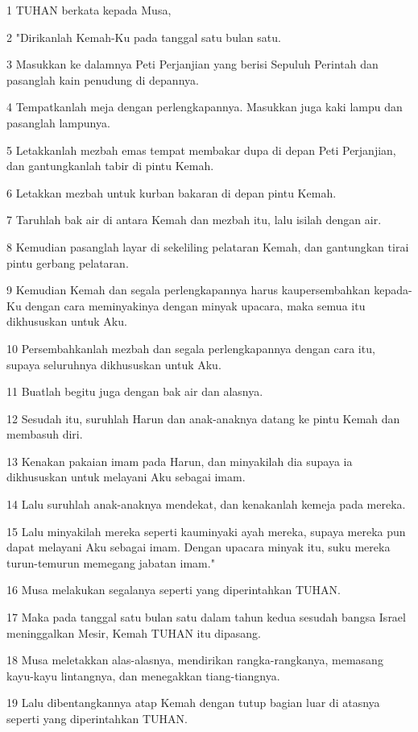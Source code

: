 \par 1 TUHAN berkata kepada Musa,
\par 2 "Dirikanlah Kemah-Ku pada tanggal satu bulan satu.
\par 3 Masukkan ke dalamnya Peti Perjanjian yang berisi Sepuluh Perintah dan pasanglah kain penudung di depannya.
\par 4 Tempatkanlah meja dengan perlengkapannya. Masukkan juga kaki lampu dan pasanglah lampunya.
\par 5 Letakkanlah mezbah emas tempat membakar dupa di depan Peti Perjanjian, dan gantungkanlah tabir di pintu Kemah.
\par 6 Letakkan mezbah untuk kurban bakaran di depan pintu Kemah.
\par 7 Taruhlah bak air di antara Kemah dan mezbah itu, lalu isilah dengan air.
\par 8 Kemudian pasanglah layar di sekeliling pelataran Kemah, dan gantungkan tirai pintu gerbang pelataran.
\par 9 Kemudian Kemah dan segala perlengkapannya harus kaupersembahkan kepada-Ku dengan cara meminyakinya dengan minyak upacara, maka semua itu dikhususkan untuk Aku.
\par 10 Persembahkanlah mezbah dan segala perlengkapannya dengan cara itu, supaya seluruhnya dikhususkan untuk Aku.
\par 11 Buatlah begitu juga dengan bak air dan alasnya.
\par 12 Sesudah itu, suruhlah Harun dan anak-anaknya datang ke pintu Kemah dan membasuh diri.
\par 13 Kenakan pakaian imam pada Harun, dan minyakilah dia supaya ia dikhususkan untuk melayani Aku sebagai imam.
\par 14 Lalu suruhlah anak-anaknya mendekat, dan kenakanlah kemeja pada mereka.
\par 15 Lalu minyakilah mereka seperti kauminyaki ayah mereka, supaya mereka pun dapat melayani Aku sebagai imam. Dengan upacara minyak itu, suku mereka turun-temurun memegang jabatan imam."
\par 16 Musa melakukan segalanya seperti yang diperintahkan TUHAN.
\par 17 Maka pada tanggal satu bulan satu dalam tahun kedua sesudah bangsa Israel meninggalkan Mesir, Kemah TUHAN itu dipasang.
\par 18 Musa meletakkan alas-alasnya, mendirikan rangka-rangkanya, memasang kayu-kayu lintangnya, dan menegakkan tiang-tiangnya.
\par 19 Lalu dibentangkannya atap Kemah dengan tutup bagian luar di atasnya seperti yang diperintahkan TUHAN.
